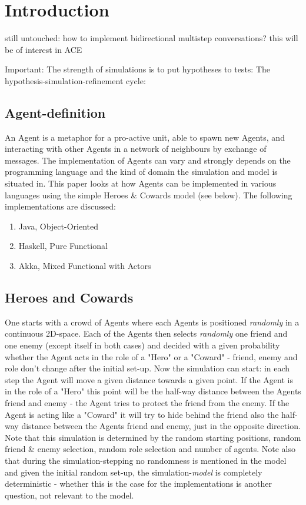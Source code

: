 \chapter{Introduction}
still untouched: how to implement bidirectional multistep conversations? this will be of interest in ACE

\graphicspath{{./fig/}}	%

Important: The strength of simulations is to put hypotheses to tests: The hypothesis-simulation-refinement cycle: 

\section{Agent-definition}
An Agent is a metaphor for a pro-active unit, able to spawn new Agents, and interacting with other Agents in a network of neighbours by exchange of messages. The implementation of Agents can vary and strongly depends on the programming language and the kind of domain the simulation and model is situated in. This paper looks at how Agents can be implemented in various languages using the simple Heroes \& Cowards model (see below). The following implementations are discussed:

\begin{enumerate}
\item Java, Object-Oriented
\item Haskell, Pure Functional
\item Akka, Mixed Functional with Actors
\end{enumerate}

\section{Heroes and Cowards}
One starts with a crowd of Agents where each Agents is positioned \textit{randomly} in a continuous 2D-space. Each of the Agents then selects \textit{randomly} one friend and one enemy (except itself in both cases) and decided with a given probability whether the Agent acts in the role of a "Hero" or a "Coward" - friend, enemy and role don't change after the initial set-up. Now the simulation can start: in each step the Agent will move a given distance towards a given point. If the Agent is in the role of a "Hero" this point will be the half-way distance between the Agents friend and enemy - the Agent tries to protect the friend from the enemy. If the Agent is acting like a "Coward" it will try to hide behind the friend also the half-way distance between the Agents friend and enemy, just in the opposite direction. \\
Note that this simulation is determined by the random starting positions, random friend \& enemy selection, random role selection and number of agents. Note also that during the simulation-stepping no randomness is mentioned in the model and given the initial random set-up, the simulation-\textit{model} is completely deterministic - whether this is the case for the implementations is another question, not relevant to the model.

